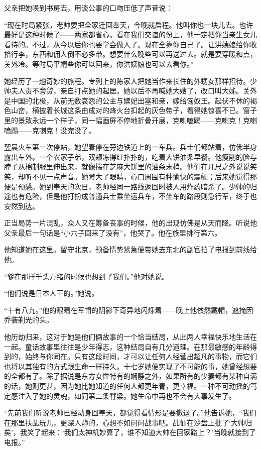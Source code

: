 \par 父亲把她唤到书房去，用谈公事的口吻压低了声音说：
\par “现在时局紧张，老帅要把全家迁回奉天，今晚就启程。他叫你也一块儿去。也许最好是这种时候了——两家都省心。看在我们交谊的份上，他一定把你当亲生女儿看待的。不过，从今以后你也要学会做人了。现在全靠你自己了。让洪姨娘给你收拾行李，东西和佣人倒不必多带。想要什么晚些可以再送过去。就是要穿暖和点，关外冷。等时局平靖些你可以回来，你洪姨娘也可以去看你。”
\par 她经历了一趟奇妙的旅程。专列上的陈家人把她当作来长住的外甥女那样招待。少帅夫人责不旁贷，亲自打点她的起居。她以后不再喊她大嫂了，改口叫大姊。关外是中国的北极，从前无数哀怨的公主与嫔妃出塞和亲，嫁给匈奴王。起伏不休的褐色山峦，横披着长城这条由成对的烽火台扣起的灰色带子，看得她惊喜不已。窗子里的景致永远一个样子，同一幅画屏不停地折叠开展，克喇嗑踢——克喇克！克喇嗑踢——克喇克！没完没了。
\par 翌晨火车第一次停站，她望着停在旁边铁道上的一车兵。兵士们都站着，仿佛半身露出车外。一个农家子弟，双颊冻得红扑扑的，吃着大饼油条早餐。他瘦削的脸与脖子从棉制服里伸出来，就像揣在芝麻大饼里的油条末梢。他们在几尺之外说说笑笑，却听不见一点声音。她瞪大了眼睛，心口周围有种愉快的震颤；后来她觉得那便是预感。她到奉天的次日，老帅经同一路线返回时被人用炸药暗杀了。少帅的归途也有危险，但是他打扮成普通兵士乘坐运兵车，不坐车的路段则急行军，终于也安然到达。
\par 正当局势一片混乱，众人又在筹备丧事的时候，他的出现仿佛是从天而降。听说他父亲最后一句话是“小六子回来了没有”，他哭了。他在族里排行第六。
\par 他知道她在这里。留守北京，预备情势紧急便带她去东北的副官拍了电报到前线给他。
\par “爹在那样千头万绪的时候也想到了我们。”他对她说。
\par “他们说是日本人干的。”她说。
\par “十有八九。”他的眼睛在军帽的阴影下奇异地闪烁着——晚上他依然戴帽，遮掩因乔装剃光的头。
\par 他历劫归来，这对于她是他们俩故事的一个恰当结局，从此两人幸福快乐地生活在一起。童话故事里往往是少年得志，这种结局自有几分道理。在那最敏感的年龄得到的，始终与你同在。只有这段时间，才可以让任何人经营出超凡的事物，而它们也将以其独有的方式跟生命一样持久。十七岁她便实现了不可能的事，她曾经想要的全都有了。除了据说是东方女性特有的娴静之外，如果所有的少妻都有某种自满的话，她则更甚，因为她比她知道的任何人都更年青，更幸福。一种不可动摇的笃定感注入了她的灵魂，如同第二条脊梁。她生命中再也不会有大事发生了。
\par “先前我们听说老帅已经动身回奉天，都觉得看情形是要撤退了。”他告诉她，“我们在那里扶乩玩儿，更深人静的，心想不如问问战事吧。乩仙在沙盘上批了‘大帅归矣’，我笑了起来：‘我们太神机妙算了，谁不知道大帅在回家路上？’当晚就接到了电报。”
